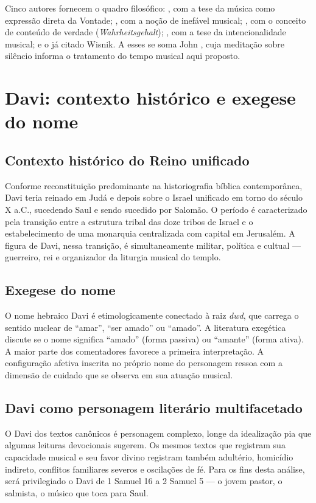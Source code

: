 \documentclass[12pt,a4paper]{article}
\begin{document}
Cinco autores fornecem o quadro filosófico: \citet{Schopenhauer2005}, com a tese da música como expressão direta da Vontade; \citet{Jankelevitch1983}, com a noção de inefável musical; \citet{Adorno2018}, com o conceito de conteúdo de verdade (\emph{Wahrheitsgehalt}); \citet{Scruton1997}, com a tese da intencionalidade musical; e o já citado Wisnik. A esses se soma John \citet{Cage1961}, cuja meditação sobre silêncio informa o tratamento do tempo musical aqui proposto.

\section{Davi: contexto histórico e exegese do nome}

\subsection{Contexto histórico do Reino unificado}

Conforme reconstituição predominante na historiografia bíblica contemporânea, Davi teria reinado em Judá e depois sobre o Israel unificado em torno do século X a.C., sucedendo Saul e sendo sucedido por Salomão. O período é caracterizado pela transição entre a estrutura tribal das doze tribos de Israel e o estabelecimento de uma monarquia centralizada com capital em Jerusalém. A figura de Davi, nessa transição, é simultaneamente militar, política e cultual --- guerreiro, rei e organizador da liturgia musical do templo.

\subsection{Exegese do nome}

O nome hebraico Davi é etimologicamente conectado à raiz \emph{dwd}, que carrega o sentido nuclear de ``amar'', ``ser amado'' ou ``amado''. A literatura exegética discute se o nome significa ``amado'' (forma passiva) ou ``amante'' (forma ativa). A maior parte dos comentadores favorece a primeira interpretação. A configuração afetiva inscrita no próprio nome do personagem ressoa com a dimensão de cuidado que se observa em sua atuação musical.

\subsection{Davi como personagem literário multifacetado}

O Davi dos textos canônicos é personagem complexo, longe da idealização pia que algumas leituras devocionais sugerem. Os mesmos textos que registram sua capacidade musical e seu favor divino registram também adultério, homicídio indireto, conflitos familiares severos e oscilações de fé. Para os fins desta análise, será privilegiado o Davi de 1 Samuel 16 a 2 Samuel 5 --- o jovem pastor, o salmista, o músico que toca para Saul.
\end{document}
